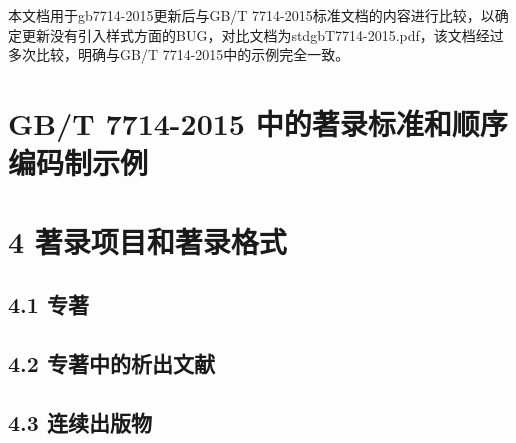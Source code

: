 \documentclass{article}
\begin{document}
{\heiti\large\noindent 本文档用于gb7714-2015更新后与GB/T 7714-2015标准文档的内容进行比较，以确定更新没有引入样式方面的BUG，对比文档为stdgbT7714-2015.pdf，该文档经过多次比较，明确与GB/T 7714-2015中的示例完全一致。

}

\section*{GB/T 7714-2015 中的著录标准和顺序编码制示例}

\section*{4 著录项目和著录格式}

\subsection*{4.1 专著}
\begin{refsection}

\nocite{陈登原2000-29-29,
哈里森沃尔德伦2012-235-236,
北京市政协民族和宗教委员会2012-112-112,
全国信息与文献标准化技术委员会2010-2-3,
徐光宪2010--,
顾炎武1992--,
王夫之1865--,
牛志明2012--,
中国第一历史档案馆2001--,
杨保军2012--,
赵学功2001--,
同济大学土木工程防灾国家重点实验室2011-5-6,
中国造纸学会2003--,
PEEBLES2001--,
Yufin2000--,
Baldock2011-105-105,
Fan2013-25-26
}

\printbibliography[heading=subbibliography,title={示例:}]
\end{refsection}

\subsection*{4.2 专著中的析出文献}
\begin{refsection}

\nocite{
王夫之2011-1109-1109,
程根伟1999-32-36,
陈晋镳1980-56-114a,
马克思2013-302-302,
贾东琴2011-45-52,
Weinstein1974-745-772,
Roberson2011-1-36
}

\printbibliography[heading=subbibliography,title={示例:}]
\end{refsection}

\subsection*{4.3 连续出版物}
\begin{refsection}

\nocite{
中华医学会湖北分会1984----,
中国图书馆学会1957--1990--,
AAAS1883----,
}

\printbibliography[heading=subbibliography,title={示例:}]
\end{refsection}
\end{document}

